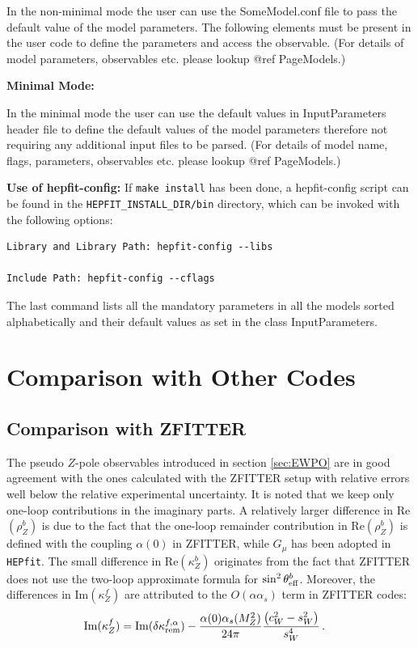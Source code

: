 \documentclass[preprint,3p,12pt]{elsarticle}
\newcommand{\HEPfit}{\texttt{HEPfit}\xspace}
\newcommand{\satoshisnotes}[1]{{\color{blue}  #1}}
\begin{document}
{In the non-minimal mode the user can use the SomeModel.conf file to pass the default value of
the model parameters. The following elements must be present in the user code to define
the parameters and access the observable. (For details of model parameters, observables etc. please lookup @ref PageModels.)


%
{\bf Minimal Mode:}

In the minimal mode the user can use the default values in InputParameters header file to define the
default values of the model parameters therefore not requiring any additional input files to be
parsed. (For details of model name, flags, parameters, observables etc. please lookup @ref PageModels.)


%
{\bf Use of hepfit-config:} If \texttt{make install} has been done, a hepfit-config script can be found in the
\texttt{HEPFIT\_INSTALL\_DIR/bin} directory, which can be invoked with the 
following options:

\begin{lstlisting}
Library and Library Path: hepfit-config --libs

Include Path: hepfit-config --cflags
\end{lstlisting}

The last command lists all the mandatory parameters in all the models sorted alphabetically and their
default values as set in the class InputParameters.
\section{Comparison with Other Codes}
\label{sec:Comparison}

\subsection{Comparison with ZFITTER}
\label{sec:ZFitter}

\satoshisnotes{%
The pseudo $Z$-pole observables introduced in section \ref{sec:EWPO} are in good agreement with the ones calculated with the ZFITTER setup \cite{Bardin:1992jc,Bardin:1999yd,Arbuzov:2005ma,Akhundov:2013ons} with relative errors well below the relative experimental uncertainty.
It is noted that we keep only one-loop contributions in the imaginary
parts. A relatively larger difference in Re$(\rho_Z^b)$ is due to the
fact that the one-loop remainder contribution in Re$(\rho_Z^b)$ is
defined with the coupling $\alpha(0)$ in ZFITTER, while 
$G_\mu$ has been adopted in \HEPfit.
The small difference in Re$(\kappa_Z^b)$ originates from the
fact that ZFITTER does not use the two-loop approximate formula for 
$\sin^2\theta_{\rm eff}^b$. Moreover, 
the differences in Im$(\kappa_Z^f)$ are attributed
to the $O(\alpha\alpha_s)$ term in ZFITTER codes: 
\begin{align}
{\rm Im}(\kappa_Z^f) &= 
{\rm Im}(\delta\kappa_{\rm rem}^{f,\alpha})
- \frac{\alpha(0)\alpha_s(M_Z^2)}{24\pi}
  \frac{\left( c_W^2- s_W^2 \right)}{s_W^4}\,. 
\end{align}

}}
\end{document}
